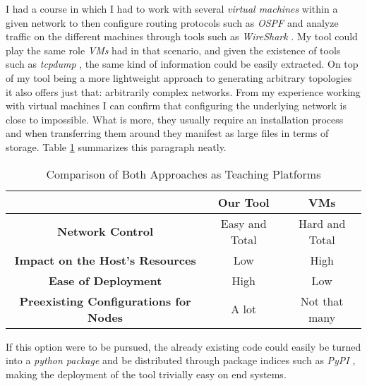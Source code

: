             I had a course in which I had to work with several \textit{virtual machines} within a given network to then configure routing protocols such as \textit{OSPF} \cite{bib:rfc2328} and analyze traffic on the different machines through tools such as \textit{WireShark} \cite{bib:wireshark}. My tool could play the same role \textit{VMs} had in that scenario, and given the existence of tools such as \textit{tcpdump} \cite{bib:man-tcpdump}, the same kind of information could be easily extracted. On top of my tool being a more lightweight approach to generating arbitrary topologies it also offers just that: arbitrarily complex networks. From my experience working with virtual machines I can confirm that configuring the underlying network is close to impossible. What is more, they usually require an installation process and when transferring them around they manifest as large files in terms of storage. Table \ref{tab:tool-vs-vm} summarizes this paragraph neatly.\\

            \begin{table}
                \centering
                \begin{tabular}{|c|c|c|}
                    \cline{2-3}
                    \multicolumn{1}{l}{} & \multicolumn{1}{|c|}{\textbf{Our Tool}} & \textbf{VMs}\\
                    \hline
                    \textbf{Network Control} & Easy and Total & Hard and Total\\
                    \hline
                    \textbf{Impact on the Host's Resources} & Low & High\\
                    \hline
                    \textbf{Ease of Deployment} & High & Low\\
                    \hline
                    \textbf{Preexisting Configurations for Nodes} & A lot & Not that many\\
                    \hline
                \end{tabular}
                \caption[Our Tool vs. VMs]{Comparison of Both Approaches as Teaching Platforms}
                \label{tab:tool-vs-vm}
            \end{table}

            If this option were to be pursued, the already existing code could easily be turned into a \textit{python package} \cite{bib:python-import} and be distributed through package indices such as \textit{PyPI} \cite{bib:pypi}, making the deployment of the tool trivially easy on end systems.\\
